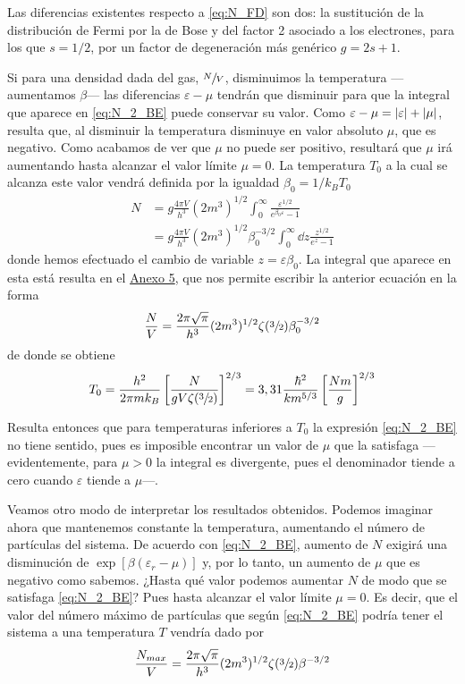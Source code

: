 Las diferencias existentes respecto a \eqref{eq:N_FD} son dos: la sustitución de la distribución de Fermi por la de Bose y del factor 2 asociado a los electrones, para los que $s = 1/2$, por un factor de degeneración más genérico $g = 2s + 1$.

Si para una densidad dada del gas, $\sfrac{N}{V}$, disminuimos la temperatura ---aumentamos $\beta$--- las diferencias $\varepsilon -\mu$ tendrán que disminuir para que la integral que aparece en \eqref{eq:N_2_BE} puede conservar su valor.
Como $\varepsilon -\mu = \abs{\varepsilon} + \abs{\mu}$, resulta que, al disminuir la temperatura disminuye en valor absoluto $\mu$, que es negativo.
Como acabamos de ver que $\mu$ no puede ser positivo, resultará que $\mu$ irá aumentando hasta alcanzar el valor límite $\mu = 0$. La temperatura $T_0$ a la cual se alcanza este valor vendrá definida por la igualdad $\beta_0 = 1/k_BT_0$
\begin{align}
	N &= g \frac{4\pi V}{h^3} (2m^3)^{1/2} \int_0^{\infty} \frac{\varepsilon^{1/2}}{e^{\beta_0\varepsilon } - 1} \nonumber \\
	&= g \frac{4\pi V}{h^3} (2m^3)^{1/2} \beta_0^{-3/2} \int_0^{\infty} \dd{z} \frac{z^{1/2}}{e^z - 1}
\end{align}
donde hemos efectuado el cambio de variable $z = \varepsilon\beta_0$.
La integral que aparece en esta está resulta en el \hyperref[Anx5]{Anexo 5}, que nos permite escribir la anterior ecuación en la forma
\begin{equation}\label{eq:N/V_BE}
	\frac{N}{V} = \frac{2\pi \sqrt{\pi}}{h^3} (2m^3)^{1/2} \zeta(\sfrac{3}{2}) \beta_0^{-3/2}
\end{equation}
de donde se obtiene
\begin{equation}\label{eq:T_0_BE}
	T_0 = \frac{h^2}{2\pi mk_B} \left[ \frac{N}{gV\zeta(\sfrac{3}{2})} \right]^{2/3} = 3,31 \frac{\hbar^2}{km^{5/3}} \left[ \frac{Nm}{g} \right]^{2/3} 
\end{equation}

Resulta entonces que para temperaturas inferiores a $T_0$ la expresión \eqref{eq:N_2_BE} no tiene sentido, pues es imposible encontrar un valor de $\mu$ que la satisfaga ---evidentemente, para $\mu > 0$ la integral es divergente, pues el denominador tiende a cero cuando $\varepsilon$ tiende a $\mu$---.

Veamos otro modo de interpretar los resultados obtenidos.
Podemos imaginar ahora que mantenemos constante la temperatura, aumentando el número de partículas del sistema.
De acuerdo con \eqref{eq:N_2_BE}, aumento de $N$ exigirá una disminución de $\exp[\beta(\varepsilon_r -\mu)]$ y, por lo tanto, un aumento de $\mu$ que es negativo como sabemos.
¿Hasta qué valor podemos aumentar $N$ de modo que se satisfaga \eqref{eq:N_2_BE}? Pues hasta alcanzar el valor límite $\mu = 0$.
Es decir, que el valor del número máximo de partículas que según \eqref{eq:N_2_BE} podría tener el sistema a una temperatura $T$ vendría dado por
\begin{equation}\label{eq:N/V_max_BE}
	\frac{N_{max}}{V} = \frac{2\pi \sqrt{\pi}}{h^3} (2m^3)^{1/2} \zeta(\sfrac{3}{2}) \beta^{-3/2}
\end{equation}

